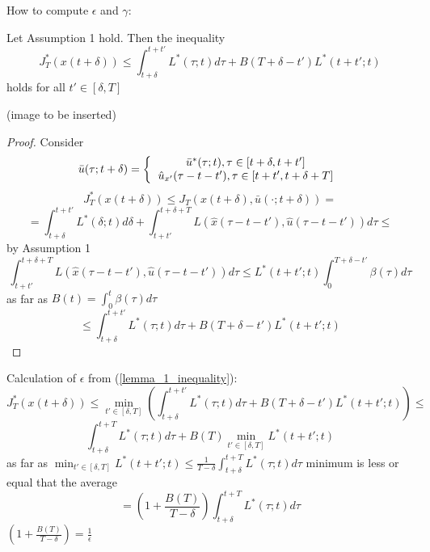 How to compute $\epsilon$ and $\gamma$:
\begin{Lemma} 
Let Assumption 1 hold. Then the inequality 
\begin{equation}\label{lemma_1_inequality}
J_T^*(x(t+\delta)) \leq \int_{t+\delta}^{t+t'}L^*(\tau;t)d\tau + B(T+\delta - t')L^*(t+t';t)
\end{equation}
holds for all $t' \in [\delta,T]$

(image to be inserted)


\begin{proof}

Consider 
\begin{equation*}
\bar u(\tau;t+\delta) = \left \{
  \begin{tabular}{c}
  $\bar u^*(\tau;t), \tau \in [t+\delta, t+t']$ \\
  $\hat u_{x'}(\tau - t - t'), \tau \in [t+t', t+\delta + T]$
  \end{tabular}
\right.
\end{equation*}
\begin{equation*}
J^*_T(x(t+\delta)) \leq J_T(x(t+\delta), \bar u(\cdot;t+\delta)) =
\end{equation*}
\begin{equation*}
=\int^{t+t'}_{t+\delta}L^*(\delta;t)d\delta + \int_{t+t'}^{t+\delta+T}L(\hat x(\tau - t - t'), \hat u (\tau - t - t'))d\tau \leq
\end{equation*} 
by Assumption 1
\begin{equation*}
\int_{t+t'}^{t+\delta+T}L(\hat x(\tau - t - t'), \hat u (\tau - t - t'))d\tau \leq L^*(t+t';t) \int_0^{T+\delta-t'}\beta(\tau)d\tau
\end{equation*}
as far as $B(t) = \int_0^t\beta(\tau)d\tau$
\begin{equation*}
\leq \int_{t+\delta}^{t+t'}L^*(\tau;t)d\tau + B(T+\delta-t')L^*(t+t';t)
\end{equation*}
\end{proof}
\end{Lemma}

Calculation of $\epsilon$ from (\ref{lemma_1_inequality}):
\begin{equation*}
J^*_T(x(t+\delta)) \leq \min_{t' \in [\delta,T]}(\int_{t+\delta}^{t+t'}L^*(\tau;t)d\tau + B(T+\delta-t')L^*(t+t';t)) \leq
\end{equation*}
\begin{equation*}
\int_{t+\delta}^{t+T}L^*(\tau;t)d\tau + B(T) \min_{t'\in[\delta,T]}L^*(t+t';t)
\end{equation*}
as far as 
$\min_{t'\in[\delta,T]}L^*(t+t';t) \leq \frac{1}{T-\delta}\int_{t+\delta}^{t+T}L^*(\tau;t)d\tau$
minimum is less or equal that the average
\begin{equation*}
=(1+\frac{B(T)}{T-\delta})\int_{t+\delta}^{t+T}L^*(\tau;t)d\tau
\end{equation*}
$(1+\frac{B(T)}{T-\delta}) = \frac{1}{\epsilon}$

